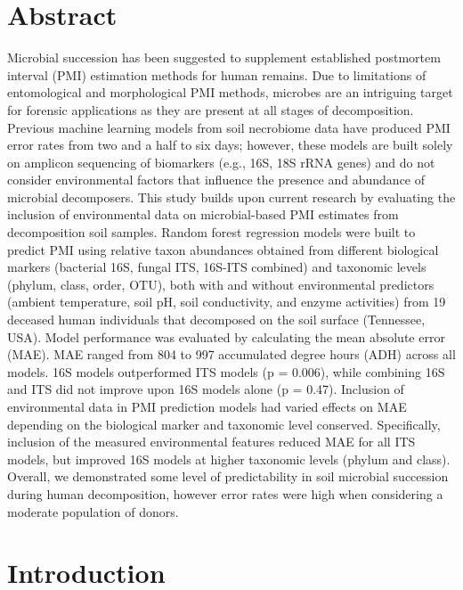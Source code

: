 \documentclass[
  10pt,
  letterpaper,
]{article}
\begin{document}
\section*{Abstract}
Microbial succession has been suggested to supplement established
postmortem interval (PMI) estimation methods for human remains. Due to
limitations of entomological and morphological PMI methods, microbes are
an intriguing target for forensic applications as they are present at
all stages of decomposition. Previous machine learning models from soil
necrobiome data have produced PMI error rates from two and a half to six
days; however, these models are built solely on amplicon sequencing of
biomarkers (e.g., 16S, 18S rRNA genes) and do not consider environmental
factors that influence the presence and abundance of microbial
decomposers. This study builds upon current research by evaluating the
inclusion of environmental data on microbial-based PMI estimates from
decomposition soil samples. Random forest regression models were built
to predict PMI using relative taxon abundances obtained from different
biological markers (bacterial 16S, fungal ITS, 16S-ITS combined) and
taxonomic levels (phylum, class, order, OTU), both with and without
environmental predictors (ambient temperature, soil pH, soil
conductivity, and enzyme activities) from 19 deceased human individuals
that decomposed on the soil surface (Tennessee, USA). Model performance
was evaluated by calculating the mean absolute error (MAE). MAE ranged
from 804 to 997 accumulated degree hours (ADH) across all models. 16S
models outperformed ITS models (p = 0.006), while combining 16S and ITS
did not improve upon 16S models alone (p = 0.47). Inclusion of
environmental data in PMI prediction models had varied effects on MAE
depending on the biological marker and taxonomic level conserved.
Specifically, inclusion of the measured environmental features reduced
MAE for all ITS models, but improved 16S models at higher taxonomic
levels (phylum and class). Overall, we demonstrated some level of
predictability in soil microbial succession during human decomposition,
however error rates were high when considering a moderate population of
donors.


\linenumbers
\section{Introduction}\label{introduction}
\end{document}

